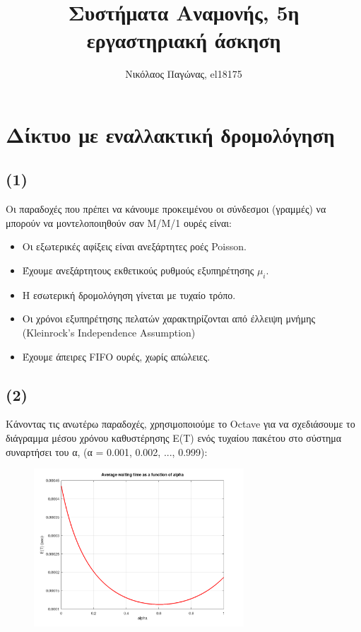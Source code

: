 \documentclass[a4paper]{article}
\title{Συστήματα Αναμονής, 5η εργαστηριακή άσκηση}
\author{Νικόλαος Παγώνας, el18175}
\date{}
\begin{document}
\maketitle

\section*{Δίκτυο με εναλλακτική δρομολόγηση}

\subsection*{(1)} 

Οι παραδοχές που πρέπει να κάνουμε προκειμένου οι σύνδεσμοι (γραμμές) να μπορούν να μοντελοποιηθούν σαν M/M/1 ουρές είναι: 

\begin{itemize}
	\item Οι εξωτερικές αφίξεις είναι ανεξάρτητες ροές Poisson.
	\item Έχουμε ανεξάρτητους εκθετικούς ρυθμούς εξυπηρέτησης $μ_i$.
	\item Η εσωτερική δρομολόγηση γίνεται με τυχαίο τρόπο.
	\item Οι χρόνοι εξυπηρέτησης πελατών χαρακτηρίζονται από έλλειψη μνήμης (Kleinrock's Independence Assumption)
	\item Έχουμε άπειρες FIFO ουρές, χωρίς απώλειες.
\end{itemize}

\subsection*{(2)}

Κάνοντας τις ανωτέρω παραδοχές, χρησιμοποιούμε το Octave για να σχεδιάσουμε το διάγραμμα μέσου χρόνου καθυστέρησης E(T) ενός τυχαίου πακέτου στο σύστημα συναρτήσει του α, (α = 0.001, 0.002, ..., 0.999):

\begin{figure}[H]
	\begin{center}
		\includegraphics[width=0.7\textwidth]{two_lines.png}
	\end{center}
\end{figure} 
\end{document}
